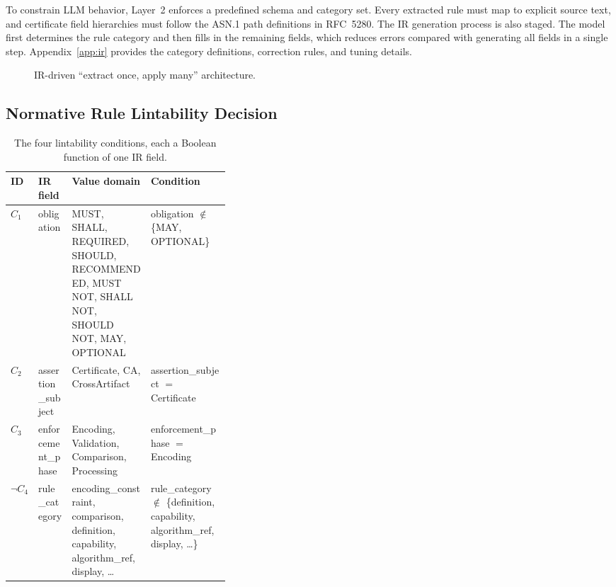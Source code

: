 To constrain LLM behavior, Layer~2 enforces a predefined schema and category set.
Every extracted rule must map to explicit source text, and certificate field hierarchies must follow the ASN.1 path definitions in RFC~5280.
The IR generation process is also staged. The model first determines the rule category and then fills in the remaining fields, which reduces errors compared with generating all fields in a single step.
Appendix~\ref{app:ir} provides the category definitions, correction rules, and tuning details.

\begin{figure}[tb]
  \centering
  \caption{IR-driven ``extract once, apply many'' architecture.}
  \label{fig:ir-downstream}
\end{figure}

\subsection{Normative Rule Lintability Decision}
\label{sec:method-lintability}
\label{sec:lintability}

\begin{table}[tb]
\centering
\caption{The four lintability conditions, each a Boolean function of one IR field.}
\label{tab:four-conditions}
\footnotesize
\setlength{\tabcolsep}{4pt}
\renewcommand{\arraystretch}{1.2}
\begin{tabularx}{\textwidth}{@{}l l L{0.36\linewidth} X@{}}
\hline
ID & IR field & Value domain & Condition \\
\hline
$C_1$      & obligation         & MUST, SHALL, REQUIRED, SHOULD, RECOMMENDED, MUST NOT, SHALL NOT, SHOULD NOT, MAY, OPTIONAL & obligation $\notin$ \{MAY, OPTIONAL\} \\
$C_2$      & assertion\_subject & Certificate, CA, CrossArtifact & assertion\_subject $=$ Certificate \\
$C_3$      & enforcement\_phase & Encoding, Validation, Comparison, Processing & enforcement\_phase $=$ Encoding \\
$\neg C_4$ & rule\_category     & encoding\_constraint, comparison, definition, capability, algorithm\_ref, display, \dots & rule\_category $\notin$ \{definition, capability, algorithm\_ref, display, \dots\} \\
\hline
\end{tabularx}
\end{table}

